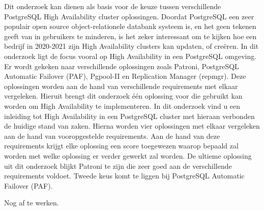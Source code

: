 Dit onderzoek kan dienen als basis voor de keuze tussen verschillende PostgreSQL High Availability cluster oplossingen. Doordat PostgreSQL een zeer populair open source object-relationele databank systeem is, en het geen tekenen geeft van in gebruikers te minderen, is het zeker interessant om te kijken hoe een bedrijf in 2020-2021 zijn High Availability clusters kan updaten, of creëren. In dit onderzoek ligt de focus vooral op High Availability in een PostgreSQL omgeving. Er wordt gekeken naar verschillende oplossingen zoals Patroni, PostgreSQL Automatic Failover (PAF), Pgpool-II en Replication Manager (repmgr). Deze oplossingen worden aan de hand van verschillende requirements met elkaar vergeleken. Hieruit brengt dit onderzoek één oplossing voor die gebruikt kan worden om High Availability te implementeren. In dit onderzoek vind u een inleiding tot High Availability in een PostgreSQL cluster met hieraan verbonden de huidige stand van zaken. Hierna worden vier oplossingen met elkaar vergeleken aan de hand van vooropgestelde requirements. Aan de hand van deze requirements krijgt elke oplossing een score toegewezen waarop bepaald zal worden met welke oplossing er verder gewerkt zal worden. De ultieme oplossing uit dit onderzoek blijkt Patroni te zijn die zeer goed aan de verschillende requirements voldoet. Tweede keus komt te liggen bij PostgreSQL Automatic Failover (PAF).

Nog af te werken.